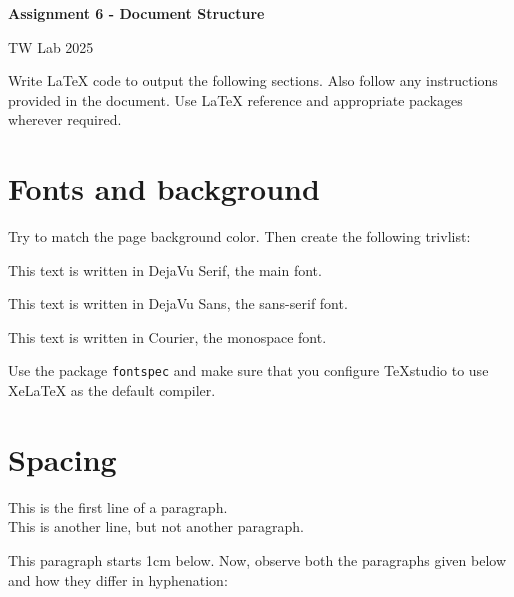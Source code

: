 \documentclass[12pt,a4paper]{article}
\begin{document}
	
	\begin{center}
		{\Large\textbf{Assignment 6 - Document Structure}}
		
		\vspace{0.3cm}
		
		TW Lab 2025
	\end{center}
	
	\vspace{1cm}
	
	\begin{center}
		Write \LaTeX{} code to output the following sections.
		Also follow any instructions provided in the document.
		Use \LaTeX{} reference and appropriate packages
		wherever required.
	\end{center}
	
	
	\section{Fonts and background}
	
	Try to match the page background color. Then create the
	following trivlist:
	
	\begin{trivlist}
		
		\item This text is written in DejaVu Serif, the main font.
		
		\item {\sffamily This text is written in DejaVu Sans,
			the sans-serif font.}
		
		\item {\ttfamily This text is written in Courier,
			the monospace font.}
		
	\end{trivlist}
	
	Use the package \texttt{fontspec} and make sure that you
	configure TeXstudio to use XeLaTeX as the default compiler.
	
	
	\section{Spacing}
	
	This is the first line of a paragraph.\\
	This is another line, but not another paragraph.
	
	\vspace{1cm}
	
	This paragraph starts 1cm below. Now, observe both the
	paragraphs given below and how they differ in hyphenation:
	
\end{document}
